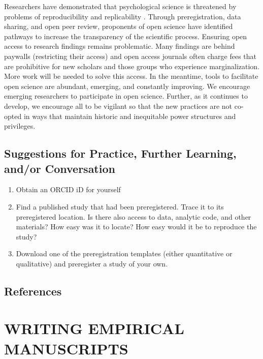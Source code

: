 \documentclass[
  11pt,
]{book}
\providecommand{\tightlist}{%
  \setlength{\itemsep}{0pt}\setlength{\parskip}{0pt}}
\begin{document}
Researchers have demonstrated that psychological science is threatened by problems of reproducibility and replicability \citep{open_science_collaboration_estimating_2015}. Through preregistration, data sharing, and open peer review, proponents of open science have identified pathways to increase the transparency of the scientific process. Ensuring open access to research findings remains problematic. Many findings are behind paywalls (restricting their access) and open access journals often charge fees that are prohibitive for new scholars and those groups who experience marginalization. More work will be needed to solve this access. In the meantime, tools to facilitate open science are abundant, emerging, and constantly improving. We encourage emerging researchers to participate in open science. Further, as it continues to develop, we encourage all to be vigilant so that the new practices are not co-opted in ways that maintain historic and inequitable power structures and privileges.

\hypertarget{suggestions-for-practice-further-learning-andor-conversation}{%
\section{Suggestions for Practice, Further Learning, and/or Conversation}\label{suggestions-for-practice-further-learning-andor-conversation}}

\begin{enumerate}
\def\labelenumi{\arabic{enumi}.}
\tightlist
\item
  Obtain an ORCID iD for yourself
\item
  Find a published study that had been preregistered. Trace it to its preregistered location. Is there also access to data, analytic code, and other materials? How easy was it to locate? How easy would it be to reproduce the study?
\item
  Download one of the preregistration templates (either quantitative or qualitative) and preregister a study of your own.
\end{enumerate}

\hypertarget{references-1}{%
\section{References}\label{references-1}}

\hypertarget{writing-empirical-manuscripts}{%
\chapter*{WRITING EMPIRICAL MANUSCRIPTS}\label{writing-empirical-manuscripts}}
\end{document}
